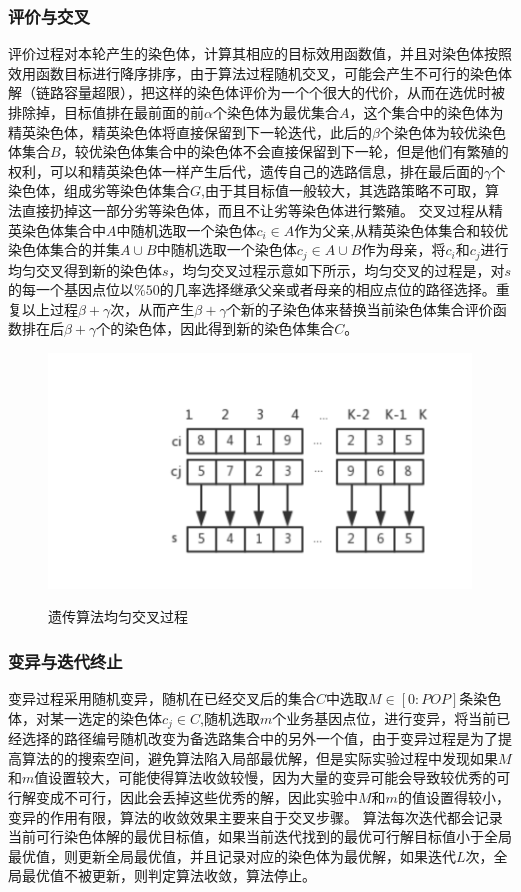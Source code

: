 \subsubsection{评价与交叉}
  评价过程对本轮产生的染色体，计算其相应的目标效用函数值，并且对染色体按照效用函数目标进行降序排序，由于算法过程随机交叉，可能会产生不可行的染色体解（链路容量超限），把这样的染色体评价为一个个很大的代价，从而在选优时被排除掉，目标值排在最前面的前$\alpha$个染色体为最优集合$A$，这个集合中的染色体为精英染色体，精英染色体将直接保留到下一轮迭代，此后的$\beta$个染色体为较优染色体集合$B$，较优染色体集合中的染色体不会直接保留到下一轮，但是他们有繁殖的权利，可以和精英染色体一样产生后代，遗传自己的选路信息，排在最后面的$\gamma$个染色体，组成劣等染色体集合$G$,由于其目标值一般较大，其选路策略不可取，算法直接扔掉这一部分劣等染色体，而且不让劣等染色体进行繁殖。
  交叉过程从精英染色体集合中$A$中随机选取一个染色体$c_i \in A$作为父亲,从精英染色体集合和较优染色体集合的并集$A \cup B$中随机选取一个染色体$c_j \in A \cup B$作为母亲，将$c_i$和$c_j$进行均匀交叉得到新的染色体$s$，均匀交叉过程示意如下所示，均匀交叉的过程是，对$s$的每一个基因点位以$\%50$的几率选择继承父亲或者母亲的相应点位的路径选择。重复以上过程$\beta+\gamma$次，从而产生$\beta+\gamma$个新的子染色体来替换当前染色体集合评价函数排在后$\beta+\gamma$个的染色体，因此得到新的染色体集合$C$。
\begin{figure}
\setlength{\belowcaptionskip}{-0.5cm}
  \begin{center}
    {\includegraphics[width=0.45 \textwidth]{figures/cross.pdf}}
    \end{center}
  \caption{{\footnotesize{遗传算法均匀交叉过程}}}
  \label{IterNum}
\end{figure}
\subsubsection{变异与迭代终止}
  变异过程采用随机变异，随机在已经交叉后的集合$C$中选取$M \in [0:POP]$条染色体，对某一选定的染色体$c_j \in C$,随机选取$m$个业务基因点位，进行变异，将当前已经选择的路径编号随机改变为备选路集合中的另外一个值，由于变异过程是为了提高算法的的搜索空间，避免算法陷入局部最优解，但是实际实验过程中发现如果$M$和$m$值设置较大，可能使得算法收敛较慢，因为大量的变异可能会导致较优秀的可行解变成不可行，因此会丢掉这些优秀的解，因此实验中$M$和$m$的值设置得较小，变异的作用有限，算法的收敛效果主要来自于交叉步骤。
  算法每次迭代都会记录当前可行染色体解的最优目标值，如果当前迭代找到的最优可行解目标值小于全局最优值，则更新全局最优值，并且记录对应的染色体为最优解，如果迭代$L$次，全局最优值不被更新，则判定算法收敛，算法停止。

